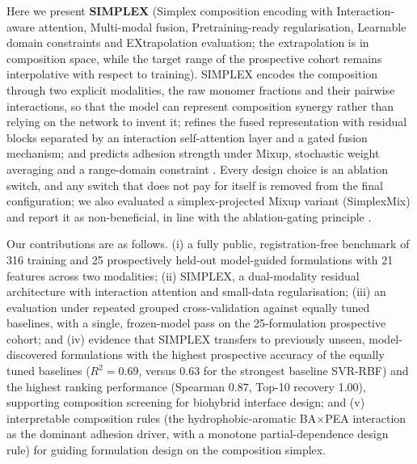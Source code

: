 \documentclass[utf8]{FrontiersinHarvard}
\begin{document}
Here we present \textbf{SIMPLEX} (Simplex composition encoding with Interaction-aware attention, Multi-modal fusion, Pretraining-ready regularisation, Learnable domain constraints and EXtrapolation evaluation; the extrapolation is in composition space, while the target range of the prospective cohort remains interpolative with respect to training). SIMPLEX encodes the composition through two explicit modalities, the raw monomer fractions and their pairwise interactions, so that the model can represent composition synergy rather than relying on the network to invent it; refines the fused representation with residual blocks separated by an interaction self-attention layer and a gated fusion mechanism; and predicts adhesion strength under Mixup, stochastic weight averaging and a range-domain constraint \cite{he2016resnet,kingma2015adam,loshchilov2019adamw,smith2019onecycle,hornik1989mlp,vaswani2017attention,perez2018film,foret2021sam,srivastava2014dropout,ioffe2015batchnorm,hendrycks2016gelu,yun2020transformers,shahriari2016bayesian,chu2020smooth,chen2022activelearning,snelson2006gp,settles2009al}. Every design choice is an ablation switch, and any switch that does not pay for itself is removed from the final configuration; we also evaluated a simplex-projected Mixup variant (SimplexMix) and report it as non-beneficial, in line with the ablation-gating principle \cite{egozcue2003clr,cole2020design,wang2023hydrogelML,pawlowsky2015modeling}.

Our contributions are as follows. (i) a fully public, registration-free benchmark of 316 training and 25 prospectively held-out model-guided formulations with 21 features across two modalities; (ii) SIMPLEX, a dual-modality residual architecture with interaction attention and small-data regularisation; (iii) an evaluation under repeated grouped cross-validation against equally tuned baselines, with a single, frozen-model pass on the 25-formulation prospective cohort; and (iv) evidence that SIMPLEX transfers to previously unseen, model-discovered formulations with the highest prospective accuracy of the equally tuned baselines ($R^2 = 0.69$, versus 0.63 for the strongest baseline SVR-RBF) and the highest ranking performance (Spearman $0.87$, Top-10 recovery 1.00), supporting composition screening for biohybrid interface design; and (v) interpretable composition rules (the hydrophobic-aromatic BA$\times$PEA interaction as the dominant adhesion driver, with a monotone partial-dependence design rule) for guiding formulation design on the composition simplex.
\end{document}
